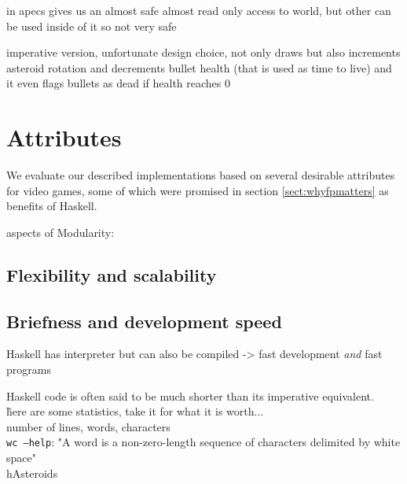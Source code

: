 \documentclass[
  digital, %
  color,   %
  table,   %
  oneside, %
  lof,     %
  lot,     %
]{fithesis3}
\begin{document}
{in apecs  gives us an almost safe almost read only access to world,
but other  can be used inside of it so not very safe

imperative version, unfortunate design choice,  not only draws
but also increments asteroid rotation and decrements bullet health (that is used as time to live)
and it even flags bullets as dead if health reaches 0

\section{Attributes}
We evaluate our described implementations based on several desirable attributes for video games,
some of which were promised in section \ref{sect:whyfpmatters} as benefits of Haskell.

aspects of Modularity:
\subsection{Flexibility and scalability}


\subsection{Briefness and development speed}

Haskell has interpreter but can also be compiled -> fast development \emph{and} fast programs

Haskell code is often said to be much shorter than its imperative equivalent.\\
\~here are some statistics, take it for what it is worth...\~\\
number of lines, words, characters\\
\texttt{wc --help}: "A word is a non-zero-length sequence of characters delimited by white space"\\

hAsteroids

}
\end{document}
